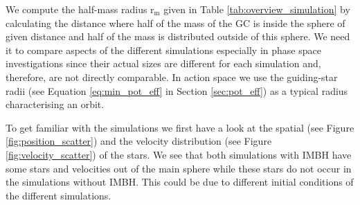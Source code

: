 \par We compute the half-mass radius \(\mathrm{r_m}\) given in Table \ref{tab:overview_simulation} by calculating the distance where half of the mass of the \ac{GC} is inside the sphere of given distance and half of the mass is distributed outside of this sphere. We need it to compare aspects of the different simulations especially in phase space investigations since their actual sizes are different for each simulation and, therefore, are not directly comparable. In action space we use the guiding-star radii (see Equation \eqref{eq:min_pot_eff} in Section \ref{sec:pot_eff}) as a typical radius characterising an orbit.
\par To get familiar with the simulations we first have a look at the spatial (see Figure \ref{fig:position_scatter}) and the velocity distribution (see Figure \ref{fig:velocity_scatter}) of the stars. We see that both simulations with \ac{IMBH} have some stars and velocities out of the main sphere while these stars do not occur in the simulations without \ac{IMBH}. This could be due to different initial conditions of the different simulations. 
